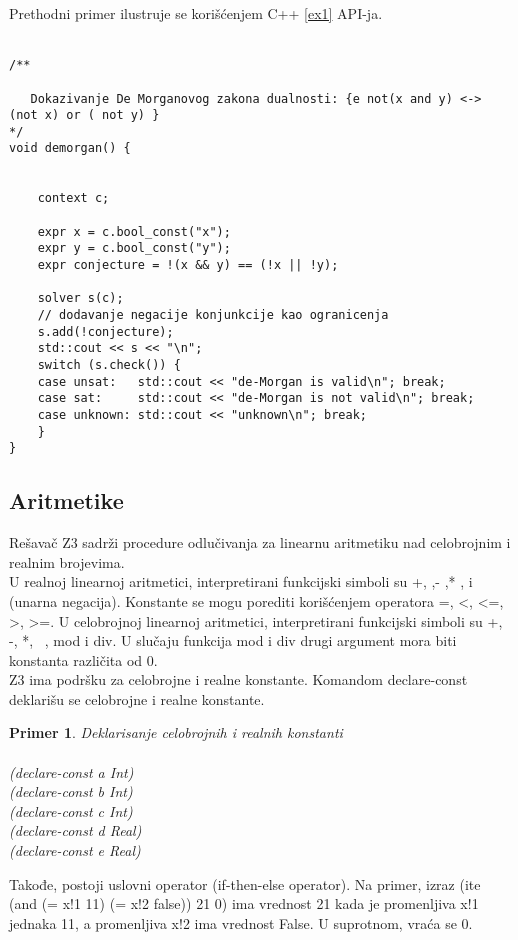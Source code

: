 \documentclass[12pt,oneside]{memoir}
\newtheorem{primer}{Primer}
\begin{document}
Prethodni primer ilustruje se korišćenjem C++ \ref{ex1} API-ja.
\\ \\
\begin{lstlisting}
/**

   Dokazivanje De Morganovog zakona dualnosti: {e not(x and y) <-> (not x) or ( not y) }
*/
void demorgan() {

    
    context c;

    expr x = c.bool_const("x");
    expr y = c.bool_const("y");
    expr conjecture = !(x && y) == (!x || !y);
    
    solver s(c);
    // dodavanje negacije konjunkcije kao ogranicenja
    s.add(!conjecture);
    std::cout << s << "\n";
    switch (s.check()) {
    case unsat:   std::cout << "de-Morgan is valid\n"; break;
    case sat:     std::cout << "de-Morgan is not valid\n"; break;
    case unknown: std::cout << "unknown\n"; break;
    }
}

\end{lstlisting}

\subsection{Aritmetike}
Rešavač Z3 sadrži procedure odlučivanja za linearnu aritmetiku nad celobrojnim i realnim brojevima.
\\
U realnoj linearnoj aritmetici, interpretirani funkcijski simboli su +, ,- ,* , i ~ (unarna negacija). Konstante se mogu porediti korišćenjem operatora =, <, <=, >, >=. U celobrojnoj linearnoj aritmetici, interpretirani funkcijski simboli su +, -, *, ~, mod i div. U slučaju funkcija mod i div drugi argument mora biti konstanta različita od 0.  
\\
Z3 ima podršku za celobrojne i realne konstante. Komandom declare-const deklarišu se celobrojne i realne konstante.
\begin{primer} Deklarisanje celobrojnih i realnih konstanti \\
\\(declare-const a Int)
\\(declare-const b Int)
\\(declare-const c Int)
\\(declare-const d Real)
\\(declare-const e Real)
\end{primer}
Takođe, postoji uslovni operator (if-then-else operator). Na primer,
izraz (ite (and (= x!1 11) (= x!2 false)) 21 0) ima vrednost 21 kada je promenljiva x!1 jednaka 11, a promenljiva x!2 ima vrednost False. U suprotnom, vraća se 0.
\end{document}
